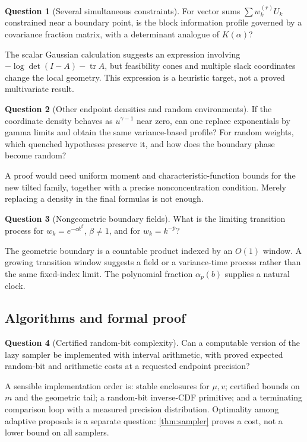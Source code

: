 \documentclass[11pt,a4paper]{article}
\numberwithin{equation}{section}
\theoremstyle{definition}
\newtheorem{question}[question]{Question}
\theoremstyle{remark}
\begin{document}
\begin{question}[Several simultaneous constraints]\label{q:multi}
For vector sums $\sum w_k^{(r)}U_k$ constrained near a boundary
point, is the block information profile governed by a covariance
fraction matrix, with a determinant analogue of $K(\alpha)$?
\end{question}
The scalar Gaussian calculation suggests an expression involving
$-\log\det(I-A)-\operatorname{tr}A$, but feasibility cones and
multiple slack coordinates change the local geometry. This
expression is a heuristic target, not a proved multivariate result.

\begin{question}[Other endpoint densities and random environments]
If the coordinate density behaves as $u^{\gamma-1}$ near zero,
can one replace exponentials by gamma limits and obtain the same
variance-based profile? For random weights, which quenched
hypotheses preserve it, and how does the boundary phase become
random?
\end{question}
A proof would need uniform moment and characteristic-function
bounds for the new tilted family, together with a precise
nonconcentration condition. Merely replacing a density in the
final formulas is not enough.

\begin{question}[Nongeometric boundary fields]
What is the limiting transition process for
$w_k=e^{-ck^\beta}$, $\beta\ne1$, and for $w_k=k^{-p}$?
\end{question}
The geometric boundary is a countable product indexed by an
$O(1)$ window. A growing transition window suggests a field or a
variance-time process rather than the same fixed-index limit.
The polynomial fraction $\alpha_p(b)$ supplies a natural clock.

\subsection{Algorithms and formal proof}
\begin{question}[Certified random-bit complexity]
Can a computable version of the lazy sampler be implemented with
interval arithmetic, with proved expected random-bit and
arithmetic costs at a requested endpoint precision?
\end{question}
A sensible implementation order is: stable enclosures for
$\mu,v$; certified bounds on $m$ and the geometric tail; a
random-bit inverse-CDF primitive; and a terminating comparison
loop with a measured precision distribution. Optimality among
adaptive proposals is a separate question: \cref{thm:sampler}
proves a cost, not a lower bound on all samplers.
\end{document}
